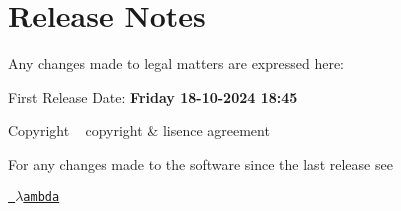 \chapter{Release Notes}
\hypertarget{md_release_2_project_2doc_2legal_2releasenotes}{}\label{md_release_2_project_2doc_2legal_2releasenotes}
Any changes made to legal matters are expressed here\+:

First Release Date\+: {\bfseries{Friday 18-\/10-\/2024 18\+:45}}

\begin{DoxyCopyright}{Copyright}
~\newline
 copyright \& lisence agreement
\end{DoxyCopyright}
For any changes made to the software since the last release see 

\href{https://www.lambda.joburg}{\texttt{ {$\lambda$}ambda}} 
